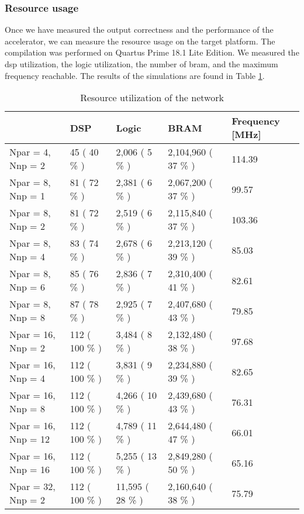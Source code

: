 \subsubsection{Resource usage}
%
Once we have measured the output correctness and the performance of the accelerator, we can measure the resource usage on the target platform. The compilation was performed on Quartus Prime 18.1 Lite Edition. We measured the \acrshort{dsp} utilization, the logic utilization, the number of \acrfull{bram}, and the maximum frequency reachable. The results of the simulations are found in Table \ref{tab:res-simu}.
%
\begin{table}[H]
\begin{tabular}{|l|l|l|l|l|}
\hline
     & DSP & Logic  & BRAM & Frequency [MHz] \\ \hline
    Npar = 4, Nnp = 2 & 45  ( 40 \% ) & 2,006  ( 5 \% ) & 2,104,960  ( 37 \% ) & 114.39 \\ \hline
    Npar = 8, Nnp = 1 & 81 ( 72 \% ) & 2,381  ( 6 \% ) & 2,067,200  ( 37 \% ) & 99.57  \\ \hline
    Npar = 8, Nnp = 2 & 81  ( 72 \% ) & 2,519 ( 6 \% ) & 2,115,840  ( 37 \% ) & 103.36  \\ \hline
    Npar = 8, Nnp = 4 & 83  ( 74 \% ) & 2,678  ( 6 \% ) & 2,213,120 ( 39 \% ) & 85.03  \\ \hline
    Npar = 8, Nnp = 6 & 85  ( 76 \% ) & 2,836  ( 7 \% ) & 2,310,400  ( 41 \% ) & 82.61 \\ \hline
    Npar = 8, Nnp = 8 & 87 ( 78 \% ) & 2,925 ( 7 \% ) & 2,407,680  ( 43 \% ) & 79.85  \\ \hline
    Npar = 16, Nnp = 2 & 112 ( 100 \% ) & 3,484  ( 8 \% ) & 2,132,480 ( 38 \% ) & 97.68  \\ \hline
    Npar = 16, Nnp = 4 & 112  ( 100 \% ) & 3,831  ( 9 \% ) & 2,234,880 ( 39 \% ) & 82.65 \\ \hline
    Npar = 16, Nnp = 8 & 112  ( 100 \% ) & 4,266 ( 10 \% ) & 2,439,680 ( 43 \% ) & 76.31  \\ \hline
    Npar = 16, Nnp = 12 & 112  ( 100 \% ) & 4,789  ( 11 \% ) & 2,644,480  ( 47 \% ) & 66.01 \\ \hline
    Npar = 16, Nnp = 16 & 112 ( 100 \% ) & 5,255  ( 13 \% ) & 2,849,280 ( 50 \% ) & 65.16 \\ \hline
    Npar = 32, Nnp = 2 & 112 ( 100 \% ) & 11,595  ( 28 \% ) & 2,160,640  ( 38 \% ) & 75.79 \\ \hline
\end{tabular}
    \caption{Resource utilization of the network}
    \label{tab:res-simu}
\end{table}

